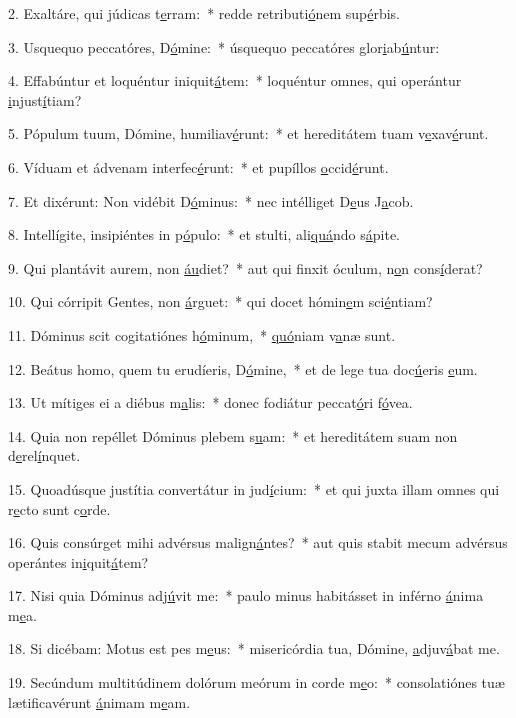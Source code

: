 2. Exaltáre, qui júdicas t\uline{e}rram:~* redde retributi\uline{ó}nem sup\uline{é}rbis.\par 
3. Usquequo peccatóres, D\uline{ó}mine:~* úsquequo peccatóres glor\uline{i}ab\uline{ú}ntur:\par 
4. Effabúntur et loquéntur iniquit\uline{á}tem:~* loquéntur omnes, qui operántur \uline{i}njust\uline{í}tiam?\par 
5. Pópulum tuum, Dómine, humiliav\uline{é}runt:~* et hereditátem tuam v\uline{e}xav\uline{é}runt.\par 
6. Víduam et ádvenam interfec\uline{é}runt:~* et pupíllos \uline{o}ccid\uline{é}runt.\par 
7. Et dixérunt: Non vidébit D\uline{ó}minus:~* nec intélliget D\uline{e}us J\uline{a}cob.\par 
8. Intellígite, insipiéntes in p\uline{ó}pulo:~* et stulti, ali\uline{quá}ndo s\uline{á}pite.\par 
9. Qui plantávit aurem, non \uline{áu}diet?~* aut qui finxit óculum, n\uline{o}n cons\uline{í}derat?\par 
10. Qui córripit Gentes, non \uline{á}rguet:~* qui docet hómin\uline{e}m sci\uline{é}ntiam?\par 
11. Dóminus scit cogitatiónes h\uline{ó}minum,~* \uline{quó}niam v\uline{a}næ sunt.\par 
12. Beátus homo, quem tu erudíeris, D\uline{ó}mine,~* et de lege tua doc\uline{ú}eris \uline{e}um.\par 
13. Ut mítiges ei a diébus m\uline{a}lis:~* donec fodiátur peccat\uline{ó}ri f\uline{ó}vea.\par 
14. Quia non repéllet Dóminus plebem s\uline{u}am:~* et hereditátem suam non d\uline{e}rel\uline{í}nquet.\par 
15. Quoadúsque justítia convertátur in jud\uline{í}cium:~* et qui juxta illam omnes qui r\uline{e}cto sunt c\uline{o}rde.\par 
16. Quis consúrget mihi advérsus malign\uline{á}ntes?~* aut quis stabit mecum advérsus operántes in\uline{i}quit\uline{á}tem?\par 
17. Nisi quia Dóminus adj\uline{ú}vit me:~* paulo minus habitásset in inférno \uline{á}nima m\uline{e}a.\par 
18. Si dicébam: Motus est pes m\uline{e}us:~* misericórdia tua, Dómine, \uline{a}djuv\uline{á}bat me.\par 
19. Secúndum multitúdinem dolórum meórum in corde m\uline{e}o:~* consolatiónes tuæ lætificavérunt \uline{á}nimam m\uline{e}am.\par 

